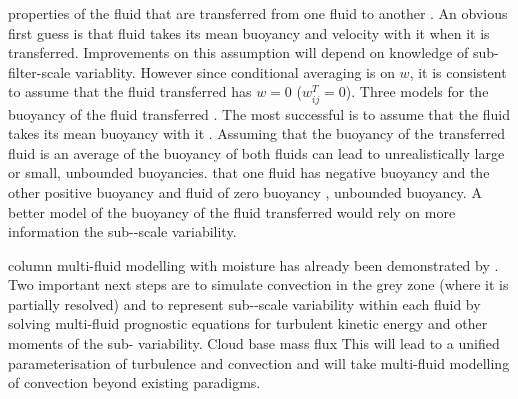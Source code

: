 \documentclass[draft]{agujournal2019}
\begin{document}
 properties of the fluid that are transferred from one fluid to another . An obvious
first guess is that fluid takes its mean buoyancy and velocity
with it when it is transferred.
{Improvements on this assumption will depend on knowledge of sub-filter-scale variablity. However since conditional averaging is on $w$, it is consistent to assume that the fluid transferred has $w=0$ ($w_{ij}^T=0$).}
Three models for the buoyancy of the fluid transferred 
. The most successful
is to assume that the fluid takes its mean buoyancy with it
.
Assuming that the buoyancy of the transferred fluid is an average of the buoyancy of both fluids  can lead to unrealistically large or small, unbounded buoyancies. 
that one fluid has negative buoyancy and the other positive buoyancy and 
fluid of zero buoyancy , unbounded buoyancy. A better model of the buoyancy
of the fluid transferred would rely on more information  the
sub--scale variability.

 column multi-fluid modelling with moisture has already been demonstrated by  
.
Two important next steps are to simulate convection in the grey zone (where it is partially resolved) and to represent sub--scale variability within each fluid by solving multi-fluid prognostic equations for turbulent kinetic energy and other moments of the sub- variability. 
Cloud base mass flux 
This will lead
to a unified parameterisation of turbulence and convection and will
take multi-fluid modelling of convection beyond existing paradigms. 
\end{document}
